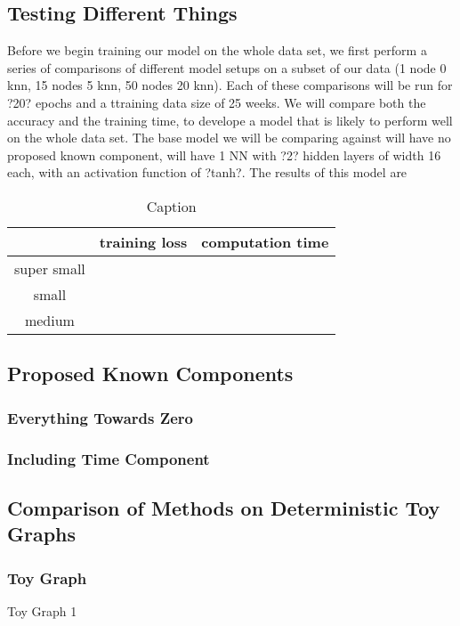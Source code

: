 \documentclass{article}
\begin{document}
    \subsection{Testing Different Things}
        Before we begin training our model on the whole data set, we first perform a series of comparisons of different model setups on a subset of our data (1 node 0 knn, 15 nodes 5 knn, 50 nodes 20 knn). Each of these comparisons will be run for ?20? epochs and a ttraining data size of 25 weeks. We will compare both the accuracy and the training time, to develope a model that is likely to perform well on the whole data set. The base model we will be comparing against will have no proposed known component, will have 1 NN with ?2? hidden layers of width 16 each, with an activation function of ?tanh?. The results of this model are
        \begin{table}[]
            \centering
            \begin{tabular}{c|c|c}
                 & training loss & computation time \\
                 \hline
                 super small &  \\
                 small & \\
                 medium &
            \end{tabular}
            \caption{Caption}
            \label{tab:my_label}
        \end{table}
        
    \subsection{Proposed Known Components}
        \subsubsection{Everything Towards Zero} 
        \subsubsection{Including Time Component}
    \subsection{Comparison of Methods on Deterministic Toy Graphs}
        \subsubsection{Toy Graph}
            Toy Graph 1\\
            
\end{document}
